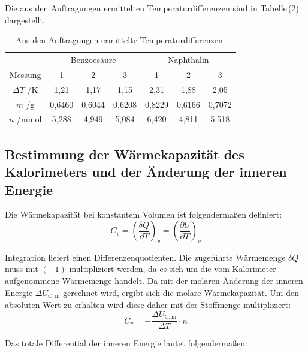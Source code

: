 \documentclass[12pt,a4paper,titlepage,headinclude,bibtotoc]{scrartcl}
\begin{document}
Die aus den Auftragungen ermittelten Temperaturdifferenzen sind in Tabelle\,(2)
 dargestellt. \\

\begin{center}
\begin{table} [ht!] \label{TabDeltaT}
\centering
\caption{Aus den Auftragungen ermittelte Temperaturdifferenzen.}
\begin{tabular}{c|c|c|c|c|c|c}
&\multicolumn{3}{c|}{Benzoesäure} & \multicolumn{3}{c}{Naphthalin}\\ 
Messung& 1&2&3&1&2&3\\
\hline 
$\Delta T$ /K & 1,21 & 1,17 & 1,15 & 2,31 & 1,88 & 2,05 \\ 
$m$ /g&0,6460&0,6044&0,6208&0,8229&0,6166&0,7072\\
$n$ /mmol& 5,288&4,949&5,084&6,420&4,811&5,518\\
\end{tabular} 
\end{table}
\end{center}
\FloatBarrier

\subsection{Bestimmung der Wärmekapazität des Kalorimeters und der Änderung der inneren Energie}
Die Wärmekapazität bei konstantem Volumen ist folgendermaßen definiert:\\

\begin{equation}
C_v = \left(\frac{\delta Q}{\partial T}\right)_v = \left(\frac{\partial U}{\partial T}\right)_v
\end{equation}

Integration liefert einen Differenzenquotienten. Die zugeführte Wärmemenge $\delta Q$ muss mit $(-1)$ multipliziert werden, da es sich um die vom Kalorimeter aufgenommene Wärmemenge handelt. Da mit der molaren Änderung der inneren Energie $\Delta U_\mathrm{C,m}$ gerechnet wird, ergibt sich die molare Wärmekapazität. Um den absoluten Wert zu erhalten wird diese daher mit der Stoffmenge multipliziert:\\

\begin{equation}\label{Waermekapazitaet}
C_v= - \frac{\Delta U_\mathrm{C,m}}{\Delta T} \cdot n
\end{equation}

\newpage
Das totale Differential der inneren Energie lautet folgendermaßen:\\
\end{document}
